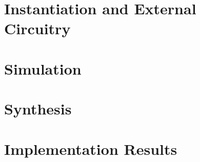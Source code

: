 \documentclass{\TEX/ug/ug}
\begin{document}
\section{Instantiation and External Circuitry}
\label{sec:inst}


\section{Simulation}
\label{sec:tbbd}


\section{Synthesis}
\label{sec:synth}


\ifdefined\RESULTS
\section{Implementation Results}
\label{sec:results}

\fi

\ifdefined\CUSTOM

\fi
\end{document}
